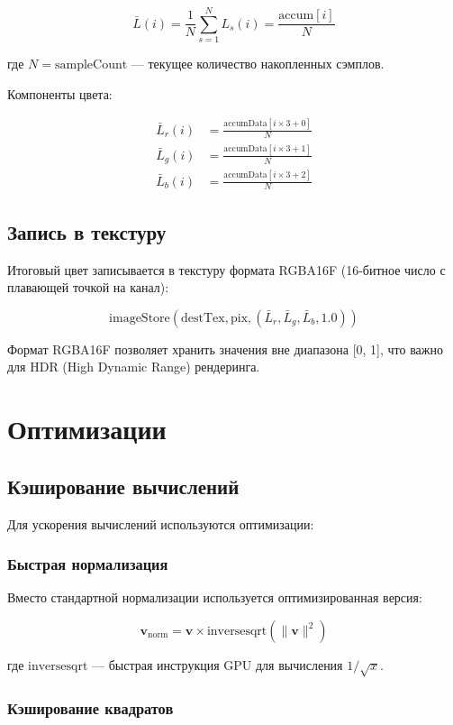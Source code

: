 \documentclass[14pt, a4paper]{extarticle}
\begin{document}
\[
\bar{L}(i) = \frac{1}{N} \sum_{s=1}^{N} L_s(i) = \frac{\text{accum}[i]}{N}
\]

где $N = \text{sampleCount}$ --- текущее количество накопленных сэмплов.

Компоненты цвета:

\begin{align}
\bar{L}_r(i) &= \frac{\text{accumData}[i \times 3 + 0]}{N} \\
\bar{L}_g(i) &= \frac{\text{accumData}[i \times 3 + 1]}{N} \\
\bar{L}_b(i) &= \frac{\text{accumData}[i \times 3 + 2]}{N}
\end{align}

\subsection{Запись в текстуру}

Итоговый цвет записывается в текстуру формата RGBA16F (16-битное число с плавающей точкой на канал):

\[
\text{imageStore}(\text{destTex}, \text{pix}, (\bar{L}_r, \bar{L}_g, \bar{L}_b, 1.0))
\]

Формат RGBA16F позволяет хранить значения вне диапазона [0, 1], что важно для HDR (High Dynamic Range) рендеринга.

\section{Оптимизации}

\subsection{Кэширование вычислений}

Для ускорения вычислений используются оптимизации:

\subsubsection{Быстрая нормализация}

Вместо стандартной нормализации используется оптимизированная версия:

\[
\mathbf{v}_{\text{norm}} = \mathbf{v} \times \text{inversesqrt}(\|\mathbf{v}\|^2)
\]

где $\text{inversesqrt}$ --- быстрая инструкция GPU для вычисления $1/\sqrt{x}$.

\subsubsection{Кэширование квадратов}
\end{document}
